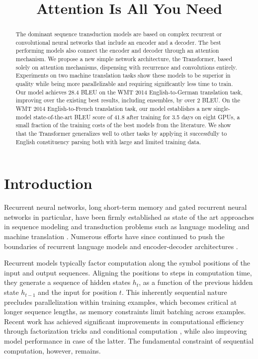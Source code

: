 
\title{Attention Is All You Need}

\begin{abstract}
The dominant sequence transduction models are based on complex recurrent or convolutional neural networks that include an encoder and a decoder. The best performing models also connect the encoder and decoder through an attention mechanism. We propose a new simple network architecture, the Transformer, based solely on attention mechanisms, dispensing with recurrence and convolutions entirely. Experiments on two machine translation tasks show these models to be superior in quality while being  more parallelizable and requiring significantly less time to train. Our model achieves 28.4 BLEU on the WMT 2014 English-to-German translation task, improving over the existing best results, including ensembles, by over 2 BLEU.  On the WMT 2014 English-to-French translation task, our model establishes a new single-model state-of-the-art BLEU score of 41.8 after training for 3.5 days on eight GPUs, a small fraction of the training costs of the best models from the literature. We show that the Transformer generalizes well to other tasks by applying it successfully to English constituency parsing  both with large and limited training data.
\end{abstract}

\section{Introduction}

Recurrent neural networks, long short-term memory \citep{hochreiter1997} and gated recurrent \citep{gruEval14} neural networks in particular, have been firmly established as state of the art approaches in sequence modeling and transduction problems such as language modeling and machine translation \citep{sutskever14, bahdanau2014neural, cho2014learning}. Numerous efforts have since continued to push the boundaries of recurrent language models and encoder-decoder architectures \citep{wu2016google,luong2015effective,jozefowicz2016exploring}.

Recurrent models typically factor computation along the symbol positions of the input and output sequences. Aligning the positions to steps in computation time, they generate a sequence of hidden states $h_t$, as a function of the previous hidden state $h_{t-1}$ and the input for position $t$. This inherently sequential nature precludes parallelization within training examples, which becomes critical at longer sequence lengths, as memory constraints limit batching across examples.
Recent work has achieved significant improvements in computational efficiency through factorization tricks \citep{Kuchaiev2017Factorization} and conditional computation \citep{shazeer2017outrageously}, while also improving model performance in case of the latter. The fundamental constraint of sequential computation, however, remains.

